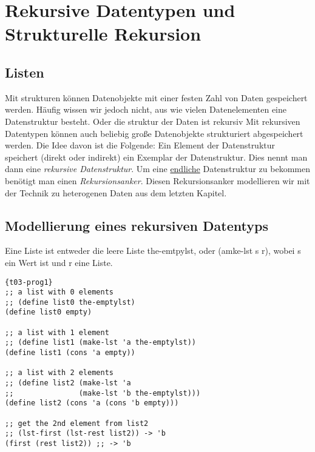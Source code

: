 \chapter{Rekursive Datentypen und Strukturelle Rekursion}
\section{Listen}
Mit strukturen können Datenobjekte mit einer festen Zahl von Daten gespeichert werden. Häufig wissen wir jedoch nicht, aus wie vielen Datenelementen eine Datenstruktur besteht.
Oder die struktur der Daten ist rekursiv
Mit rekursiven Datentypen können auch beliebig große Datenobjekte strukturiert abgespeichert werden. Die Idee davon ist die Folgende: Ein Element der Datenstruktur speichert (direkt oder indirekt) ein Exemplar der Datenstruktur. Dies nennt man dann eine \textit{rekursive Datenstruktur}. Um eine \uline{endliche} Datenstruktur zu bekommen benötigt man einen \textit{Rekursionsanker}. Diesen Rekursionsanker modellieren wir mit der Technik zu heterogenen Daten aus dem letzten Kapitel.

\section{Modellierung eines rekursiven Datentyps}

Eine Liste ist entweder die leere Liste the-emtpylst, oder (amke-lst s r), wobei s ein Wert ist und r eine Liste.

\begin{lstlisting}{t03-prog1}
;; a list with 0 elements
;; (define list0 the-emptylst)
(define list0 empty)

;; a list with 1 element
;; (define list1 (make-lst 'a the-emptylst))
(define list1 (cons 'a empty))

;; a list with 2 elements
;; (define list2 (make-lst 'a
;;               (make-lst 'b the-emptylst)))
(define list2 (cons 'a (cons 'b empty)))

;; get the 2nd element from list2
;; (lst-first (lst-rest list2)) -> 'b
(first (rest list2)) ;; -> 'b
\end{lstlisting}
